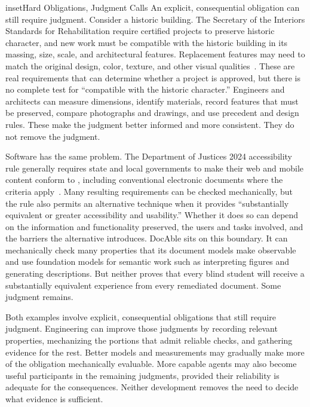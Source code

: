 \begin{bookbox}{inset}{Hard Obligations, Judgment Calls}
\label{inset-hard-obligations-judgment-calls}
An explicit, consequential obligation can still require judgment. Consider a historic building. The Secretary of the Interior\textquotesingle s Standards for Rehabilitation require certified projects to preserve historic character, and new work must be compatible with the historic building in its massing, size, scale, and architectural features. Replacement features may need to match the original design, color, texture, and other visual qualities~\citep{nps-rehab-standards}. These are real requirements that can determine whether a project is approved, but there is no complete test for ``compatible with the historic character.'' Engineers and architects can measure dimensions, identify materials, record features that must be preserved, compare photographs and drawings, and use precedent and design rules. These make the judgment better informed and more consistent. They do not remove the judgment.

Software has the same problem. The Department of Justice\textquotesingle s 2024 accessibility rule generally requires state and local governments to make their web and mobile content conform to , including conventional electronic documents where the criteria apply~\citep{doj-web-accessibility-2024}. Many resulting requirements can be checked mechanically, but the rule also permits an alternative technique when it provides ``substantially equivalent or greater accessibility and usability.'' Whether it does so can depend on the information and functionality preserved, the users and tasks involved, and the barriers the alternative introduces. DocAble sits on this boundary. It can mechanically check many properties that its document models make observable and use foundation models for semantic work such as interpreting figures and generating descriptions. But neither proves that every blind student will receive a substantially equivalent experience from every remediated document. Some judgment remains.

Both examples involve explicit, consequential obligations that still require judgment. Engineering can improve those judgments by recording relevant properties, mechanizing the portions that admit reliable checks, and gathering evidence for the rest. Better models and measurements may gradually make more of the obligation mechanically evaluable. More capable agents may also become useful participants in the remaining judgments, provided their reliability is adequate for the consequences. Neither development removes the need to decide what evidence is sufficient.
\end{bookbox}

